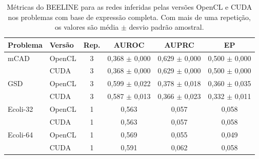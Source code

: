 \begin{table}[htb]
    \centering
    \caption{Métricas do BEELINE para as redes inferidas pelas versões OpenCL
    e CUDA nos problemas com base de expressão completa. Com mais de uma
    repetição, os valores são média $\pm$ desvio padrão amostral.}
    \label{tab:beeline}
    \begin{tabular}{l l c c c c}
        \hline
        Problema & Versão & Rep. & AUROC & AUPRC & EP \\
        \hline
        mCAD & OpenCL & 3 & 0,368 $\pm$ 0,000 & 0,629 $\pm$ 0,000 & 0,500 $\pm$ 0,000 \\
         & CUDA & 3 & 0,368 $\pm$ 0,000 & 0,629 $\pm$ 0,000 & 0,500 $\pm$ 0,000 \\
        \hline
        GSD & OpenCL & 3 & 0,599 $\pm$ 0,022 & 0,378 $\pm$ 0,018 & 0,360 $\pm$ 0,035 \\
         & CUDA & 3 & 0,587 $\pm$ 0,013 & 0,366 $\pm$ 0,023 & 0,332 $\pm$ 0,011 \\
        \hline
        Ecoli-32 & OpenCL & 1 & 0,563 & 0,057 & 0,058 \\
         & CUDA & 1 & 0,563 & 0,057 & 0,058 \\
        \hline
        Ecoli-64 & OpenCL & 1 & 0,569 & 0,055 & 0,049 \\
         & CUDA & 1 & 0,591 & 0,062 & 0,058 \\
        \hline
    \end{tabular}
\end{table}
